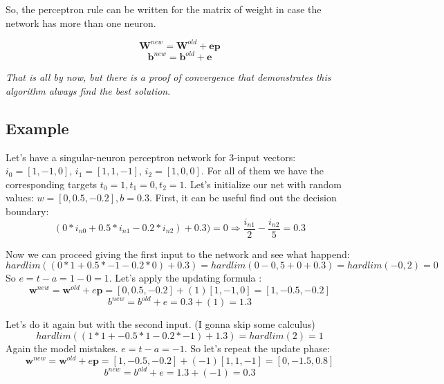 So, the perceptron rule can be written for the matrix of weight in case the network has more than one neuron.

\begin{equation}
\textbf{W}^{new} = \textbf{W}^{old} + \textbf{e}\textbf{p}
\end{equation}
\begin{equation}
\textbf{b}^{new} = \textbf{b}^{old} + \textbf{e}
\end{equation}

\textit{That is all by now, but there is a proof of convergence that demonstrates this algorithm always find the best solution}.

\subsection{Example}
Let's have a singular-neuron perceptron network for 3-input vectors: $i_0 = [1,-1,0]$, $i_1 = [1,1,-1]$, $i_2 = [1,0,0]$. For all of them we have the corresponding targets $t_0 = 1,  t_1 = 0,  t_2 = 1$. Let's initialize our net with random values: $w = [0, 0.5, -0.2], b = 0.3$.
\newline
First, it can be useful find out the decision boundary:
\begin{equation}
(0*i_{n0} + 0.5 * i_{n1} - 0.2 * i_{n2}) + 0.3) = 0 \Rightarrow \frac{i_{n1}}{2} - \frac{i_{n2}}{5} = 0.3
\end{equation}

Now we can proceed giving the first input to the network and see what happend:
\begin{equation}
hardlim((0*1 + 0.5 * -1 - 0.2 * 0) + 0.3) = hardlim(0 - 0,5 + 0 + 0.3) = hardlim(-0,2) = 0 
\end{equation}
So $e = t - a = 1 - 0 = 1$. Let's apply the updating formula :
\begin{equation}
\textbf{w}^{new} = \textbf{w}^{old} + e\textbf{p} = [0, 0.5, -0.2] + (1)[1, -1, 0] = [1, -0.5, -0.2]
\end{equation}
\begin{equation}
b^{new} = b^{old} + e = 0.3 + (1)= 1.3
\end{equation}

Let's do it again but with the second input. (I gonna skip some calculus)
\begin{equation}
hardlim((1*1 + -0.5 * 1 - 0.2 * -1) + 1.3) = hardlim(2) = 1 
\end{equation}
Again the model mistakes. $e = t - a = -1$. So let's repeat the update phase:
\begin{equation}
\textbf{w}^{new} = \textbf{w}^{old} + e\textbf{p} = [1,-0.5,-0.2] + (-1)[1, 1, -1] = [0, -1.5, 0.8]
\end{equation}
\begin{equation}
b^{new} = b^{old} + e = 1.3 + (-1)= 0.3
\end{equation}

